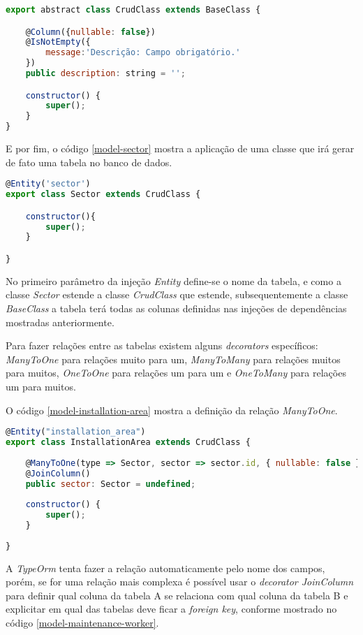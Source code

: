 \begin{lstlisting}[language=JavaScript, caption={CrudClass: Mapeamento de propriedades para cruds genéricos}, label={typeorm-crud-class}]
export abstract class CrudClass extends BaseClass {

	@Column({nullable: false})
	@IsNotEmpty({
		message:'Descrição: Campo obrigatório.'
	})
	public description: string = '';

	constructor() {
		super();
	}
}
\end{lstlisting}

E por fim, o código \ref{model-sector} mostra a aplicação de uma classe que irá gerar de fato uma tabela no banco de dados.

\begin{lstlisting}[language=JavaScript, caption={Mapeamento de propriedades da tabela sector}, label={model-sector}]
@Entity('sector')
export class Sector extends CrudClass {

	constructor(){
		super();
	}

}
\end{lstlisting}

No primeiro parâmetro da injeção \textit{Entity} define-se o nome da tabela, e como a classe \textit{Sector} estende a classe \textit{CrudClass} que estende, subsequentemente a classe \textit{BaseClass} a tabela terá todas as colunas definidas nas injeções de dependências mostradas anteriormente.

Para fazer relações entre as tabelas existem alguns \textit{decorators} específicos: \textit{ManyToOne} para relações muito para um, \textit{ManyToMany} para relações muitos para muitos, \textit{OneToOne} para relações um para um e \textit{OneToMany} para relações um para muitos.

O código \ref{model-installation-area} mostra a definição da relação \textit{ManyToOne}.

\begin{lstlisting}[language=JavaScript, caption={Mapeamento de propriedades da tabela área de installation\_area}, label={model-installation-area}]
@Entity("installation_area")
export class InstallationArea extends CrudClass {
	
	@ManyToOne(type => Sector, sector => sector.id, { nullable: false })
	@JoinColumn()
	public sector: Sector = undefined;
	
	constructor() {
		super();
	}
	
}
\end{lstlisting}

A \textit{TypeOrm} tenta fazer a relação automaticamente pelo nome dos campos, porém, se for uma relação mais complexa é possível usar o \textit{decorator JoinColumn} para definir qual coluna da tabela A se relaciona com qual coluna da tabela B e explicitar em qual das tabelas deve ficar a \textit{foreign key}, conforme mostrado no código \ref{model-maintenance-worker}.

